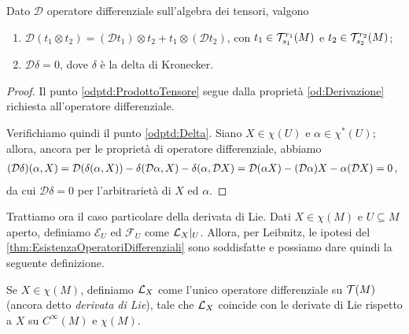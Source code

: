 \begin{corollary} \label{cor:OperatoreDifferenzialeProdottoTensoreEDelta}
	Dato $\mathcal D$ operatore differenziale sull'algebra dei tensori, valgono
	\begin{enumerate}
		\item $\mathcal D(t_1\otimes t_2) = (\mathcal D t_1) \otimes t_2 + t_1\otimes (\mathcal D t_2)$, con $t_1 \in \mathcal T^{r_1}_{s_1}(M)$ e $t_2 \in \mathcal T^{r_2}_{s_2}(M)$; \label{odptd:ProdottoTensore}
		\item $\mathcal D\delta = 0$, dove $\delta$ è la delta di Kronecker. \label{odptd:Delta}
	\end{enumerate}
\end{corollary}
\begin{proof}
	Il punto \ref{odptd:ProdottoTensore} segue dalla proprietà \ref{od:Derivazione} richiesta all'operatore differenziale. 
	
	Verifichiamo quindi il punto \ref{odptd:Delta}.	
	Siano $X\in\chi(U)$ e $\alpha\in\chi^*(U)$; allora, ancora per le proprietà di operatore differenziale, abbiamo
	\begin{align*}
	(\mathcal D\delta)(\alpha, X) = \mathcal D(\delta(\alpha,X)) - \delta(\mathcal D\alpha,X) - \delta(\alpha,\mathcal D X) = \mathcal D (\alpha X) - (\mathcal D\alpha)X - \alpha(\mathcal DX) = 0\, \text{, }
	\end{align*}
	da cui $\mathcal D\delta = 0$ per l'arbitrarietà di $X$ ed $\alpha$.
\end{proof}

Trattiamo ora il caso particolare della derivata di Lie.
Dati $X\in\chi(M)$ e $U\subseteq M$ aperto, definiamo $\mathcal E_U$ ed $\mathcal F_U$ come $\mathcal L_X|_ U$.
Allora, per Leibnitz, le ipotesi del \cref{thm:EsistenzaOperatoriDifferenziali} sono soddisfatte e possiamo dare quindi la seguente definizione.

\begin{definition} 
	Se $X\in\chi(M)$, definiamo $\mathcal L_X$ come l'unico operatore differenziale su $\mathcal T(M)$ (ancora detto \emph{derivata di Lie}), tale che $\mathcal L_X$ coincide con le derivate di Lie rispetto a $X$ su $C^\infty(M)$ e $\chi(M)$.
\end{definition}

